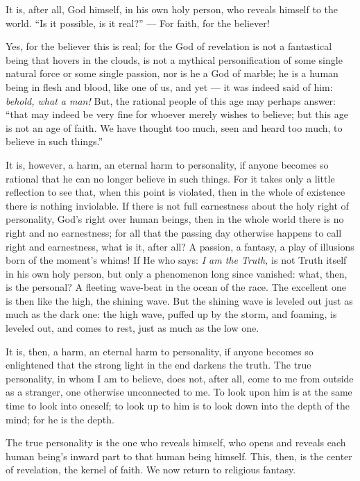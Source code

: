 \documentclass[12pt,a4paper]{book}
\begin{document}
It is, after all, God himself, in his own holy person, who reveals himself to the world. ``Is it possible, is it real?'' --- For faith, for the believer!

Yes, for the believer this is real; for the God of revelation is not a fantastical being that hovers in the clouds, is not a mythical personification of some single natural force or some single passion, nor is he a God of marble; he is a human being in flesh and blood, like one of us, and yet --- it was indeed said of him: \emph{behold, what a man!}
But, the rational people of this age may perhaps answer: ``that may indeed be very fine for whoever merely wishes to believe; but this age is not an age of faith. We have thought too much, seen and heard too much, to believe in such things.''

It is, however, a harm, an eternal harm to personality, if anyone becomes so rational that he can no longer believe in such things. For it takes only a little reflection to see that, when this point is violated, then in the whole of existence there is nothing inviolable. If there is not full earnestness about the holy right of personality, God's right over human beings, then in the whole world there is no right and no earnestness; for all that the passing day otherwise happens to call right and earnestness, what is it, after all? A passion, a fantasy, a play of illusions born of the moment's whims! If He who says: \emph{I am the Truth,} is not Truth itself in his own holy person, but only a phenomenon long since vanished: what, then, is the personal? A fleeting wave-beat in the ocean of the race. The excellent one is then like the high, the shining wave. But the shining wave is leveled out just as much as the dark one: the high wave, puffed up by the storm, and foaming, is leveled out, and comes to rest, just as much as the low one.

It is, then, a harm, an eternal harm to personality, if anyone becomes so enlightened that the strong light in the end darkens the truth. The true personality, in whom I am to believe, does not, after all, come to me from outside as a stranger, one otherwise unconnected to me. To look upon him is at the same time to look into oneself; to look up to him is to look down into the depth of the mind; for he is the depth.

The true personality is the one who reveals himself, who opens and reveals each human being's inward part to that human being himself. This, then, is the center of revelation, the kernel of faith. We now return to religious fantasy.
\end{document}
